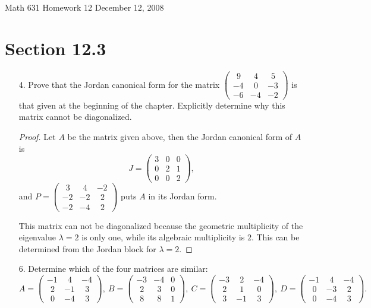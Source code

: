 \documentclass[10pt]{article}
\newcommand\header{{\sc Math 631 \hfill Homework 12 \hfill December 12, 2008}}
\begin{document}
\header

\section*{Section 12.3}

\begin{itemize}

\item[4.] Prove that the Jordan canonical form for the matrix 
$
\begin{pmatrix}
~~9 & ~~4 & ~~5\\
-4 & ~~0 & -3\\
-6 & -4 & -2
\end{pmatrix}
$
is that given at the beginning of the chapter.  Explicitly determine why this
matrix cannot be diagonalized.

\begin{proof}
Let $A$ be the matrix given above, then the Jordan canonical form of 
$A$ is
$$
J =
\begin{pmatrix}
3 & 0 & 0\\
0 & 2 & 1\\
0 & 0 & 2
\end{pmatrix},
$$
and $P =
\begin{pmatrix}
~~3 & ~~4 & -2\\
-2 & -2 & ~~2\\
-2 & -4 & ~~2
\end{pmatrix}
$ 
puts $A$ in its Jordan form.

This matrix can not be diagonalized because the geometric multiplicity of
the eigenvalue $\lambda = 2$ is only one, while its algebraic multiplicity
is $2$.  This can be determined from the Jordan block for $\lambda = 2$.
\end{proof}

\item[6.]  Determine which of the four matrices are similar:
$$
A = \begin{pmatrix}
-1 & ~~ 4 & -4\\
~~2 & -1 & ~~3\\
~~0 & -4 & ~~3
\end{pmatrix}, \ 
B = \begin{pmatrix}
-3 & -4 & 0\\
~~2 & ~~3 & 0\\
~~8 & ~~8 & 1
\end{pmatrix}, \ 
C = \begin{pmatrix}
   -3 & ~~2 & -4\\
~~2 & ~~1 & ~~0\\
~~3 &    -1 & ~~3
\end{pmatrix}, \ 
D = \begin{pmatrix}
   -1 & ~~4 & -4\\
~~0 &    -3 & ~~2\\
~~0 &    -4 & ~~3
\end{pmatrix}.
$$


\end{itemize}
\end{document}
